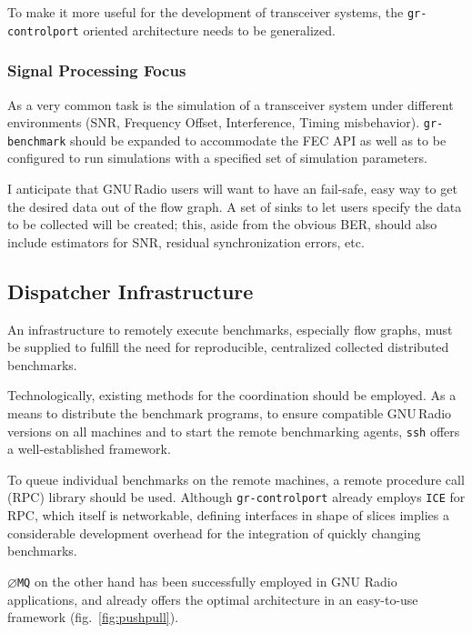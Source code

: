 \documentclass[a4paper]{IEEEtran}
\newcommand{\gr}{GNU\,Radio\xspace}
\newcommand{\grbench}{\texttt{gr-benchmark}\xspace}
\newcommand{\zeromq}{\texttt{$\varnothing$MQ}\xspace}
\begin{document}
To make it more useful for the development of transceiver systems, the
\texttt{gr-controlport} oriented architecture needs to be generalized.

\subsubsection*{Signal Processing Focus} As a very common task is the simulation
of a transceiver system under different environments (SNR, Frequency Offset,
Interference, Timing misbehavior). \grbench should be
expanded to accommodate the FEC API as well as to be configured to run
simulations with a specified set of simulation parameters. 

I anticipate that \gr users will want to have an fail-safe, easy way to get the
desired data out of the flow graph.  A set of sinks to let users specify the
data to be collected will be created; this, aside from the obvious BER, should also
include estimators for SNR, residual synchronization errors, etc.

\subsection{Dispatcher Infrastructure}

An infrastructure to remotely execute benchmarks, especially flow graphs, must
be supplied to fulfill the need for reproducible, centralized collected
distributed benchmarks.

Technologically, existing methods for the coordination should be employed.  As
a means to distribute the benchmark programs, to ensure compatible \gr versions
on all machines and to start the remote benchmarking agents, \texttt{ssh}
offers a well-established framework.

To queue individual benchmarks on the remote machines, a remote procedure call
(RPC) library should be used. Although \texttt{gr-controlport} already employs
\texttt{ICE} for RPC, which itself is networkable, defining interfaces in shape
of slices implies a considerable development overhead for the integration of
quickly changing benchmarks.

\zeromq\cite{zeromq} on the other hand has been successfully employed in GNU
Radio applications\cite{airmodes}, and already offers the optimal architecture
in an easy-to-use framework (fig.~\ref{fig:pushpull}).
\end{document}

